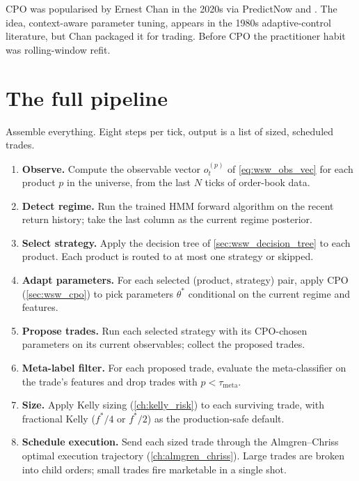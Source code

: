 \begin{historybox}
CPO was popularised by Ernest Chan in the 2020s via PredictNow and
\citep{chan2020cpo}. The idea, context-aware parameter tuning,
appears in the 1980s adaptive-control literature, but Chan
packaged it for trading. Before CPO the practitioner habit was
rolling-window refit.
\end{historybox}

\section{The full pipeline}
\label{sec:wsw_pipeline}

Assemble everything. Eight steps per tick, output is a list of
sized, scheduled trades.

\begin{keyfactbox}
\begin{enumerate}
  \item \textbf{Observe.} Compute the observable vector
  $o_t^{(p)}$ of \cref{eq:wsw_obs_vec} for each product $p$
  in the universe, from the last $N$ ticks of order-book
  data.
  \item \textbf{Detect regime.} Run the trained HMM forward
  algorithm on the recent return history; take the last
  column as the current regime posterior.
  \item \textbf{Select strategy.} Apply the decision tree of
  \cref{sec:wsw_decision_tree} to each product. Each product
  is routed to at most one strategy or skipped.
  \item \textbf{Adapt parameters.} For each selected
  (product, strategy) pair, apply CPO
  (\cref{sec:wsw_cpo}) to pick parameters $\theta^{*}$
  conditional on the current regime and features.
  \item \textbf{Propose trades.} Run each selected strategy
  with its CPO-chosen parameters on its current observables;
  collect the proposed trades.
  \item \textbf{Meta-label filter.} For each proposed trade,
  evaluate the meta-classifier on the trade's features and
  drop trades with $\hat{p} < \tau_{\text{meta}}$.
  \item \textbf{Size.} Apply Kelly sizing
  (\cref{ch:kelly_risk}) to each surviving trade, with
  fractional Kelly ($f^{*}/4$ or $f^{*}/2$) as the
  production-safe default.
  \item \textbf{Schedule execution.} Send each sized trade
  through the Almgren--Chriss optimal execution
  trajectory (\cref{ch:almgren_chriss}). Large trades are
  broken into child orders; small trades fire marketable in
  a single shot.
\end{enumerate}
\end{keyfactbox}

